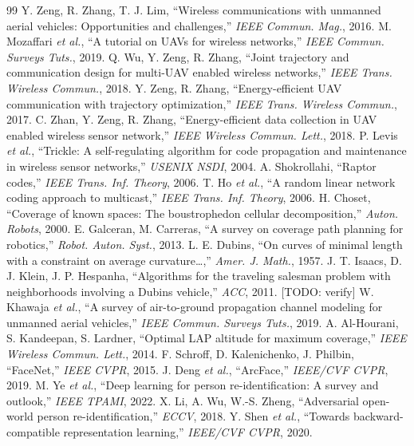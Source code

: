 \documentclass[conference]{IEEEtran}
\begin{document}
\begin{thebibliography}{99}\footnotesize
\bibitem{} Y. Zeng, R. Zhang, T. J. Lim, ``Wireless communications with unmanned aerial vehicles: Opportunities and challenges,'' \emph{IEEE Commun. Mag.}, 2016.
\bibitem{} M. Mozaffari \emph{et al.}, ``A tutorial on UAVs for wireless networks,'' \emph{IEEE Commun. Surveys Tuts.}, 2019.
\bibitem{} Q. Wu, Y. Zeng, R. Zhang, ``Joint trajectory and communication design for multi-UAV enabled wireless networks,'' \emph{IEEE Trans. Wireless Commun.}, 2018.
\bibitem{} Y. Zeng, R. Zhang, ``Energy-efficient UAV communication with trajectory optimization,'' \emph{IEEE Trans. Wireless Commun.}, 2017.
\bibitem{} C. Zhan, Y. Zeng, R. Zhang, ``Energy-efficient data collection in UAV enabled wireless sensor network,'' \emph{IEEE Wireless Commun. Lett.}, 2018.
\bibitem{} P. Levis \emph{et al.}, ``Trickle: A self-regulating algorithm for code propagation and maintenance in wireless sensor networks,'' \emph{USENIX NSDI}, 2004.
\bibitem{} A. Shokrollahi, ``Raptor codes,'' \emph{IEEE Trans. Inf. Theory}, 2006.
\bibitem{} T. Ho \emph{et al.}, ``A random linear network coding approach to multicast,'' \emph{IEEE Trans. Inf. Theory}, 2006.
\bibitem{} H. Choset, ``Coverage of known spaces: The boustrophedon cellular decomposition,'' \emph{Auton. Robots}, 2000.
\bibitem{} E. Galceran, M. Carreras, ``A survey on coverage path planning for robotics,'' \emph{Robot. Auton. Syst.}, 2013.
\bibitem{} L. E. Dubins, ``On curves of minimal length with a constraint on average curvature\dots,'' \emph{Amer. J. Math.}, 1957.
\bibitem{} J. T. Isaacs, D. J. Klein, J. P. Hespanha, ``Algorithms for the traveling salesman problem with neighborhoods involving a Dubins vehicle,'' \emph{ACC}, 2011. [TODO: verify]
\bibitem{} W. Khawaja \emph{et al.}, ``A survey of air-to-ground propagation channel modeling for unmanned aerial vehicles,'' \emph{IEEE Commun. Surveys Tuts.}, 2019.
\bibitem{} A. Al-Hourani, S. Kandeepan, S. Lardner, ``Optimal LAP altitude for maximum coverage,'' \emph{IEEE Wireless Commun. Lett.}, 2014.
\bibitem{} F. Schroff, D. Kalenichenko, J. Philbin, ``FaceNet,'' \emph{IEEE CVPR}, 2015.
\bibitem{} J. Deng \emph{et al.}, ``ArcFace,'' \emph{IEEE/CVF CVPR}, 2019.
\bibitem{} M. Ye \emph{et al.}, ``Deep learning for person re-identification: A survey and outlook,'' \emph{IEEE TPAMI}, 2022.
\bibitem{} X. Li, A. Wu, W.-S. Zheng, ``Adversarial open-world person re-identification,'' \emph{ECCV}, 2018.
\bibitem{} Y. Shen \emph{et al.}, ``Towards backward-compatible representation learning,'' \emph{IEEE/CVF CVPR}, 2020.

\end{thebibliography}
\end{document}
